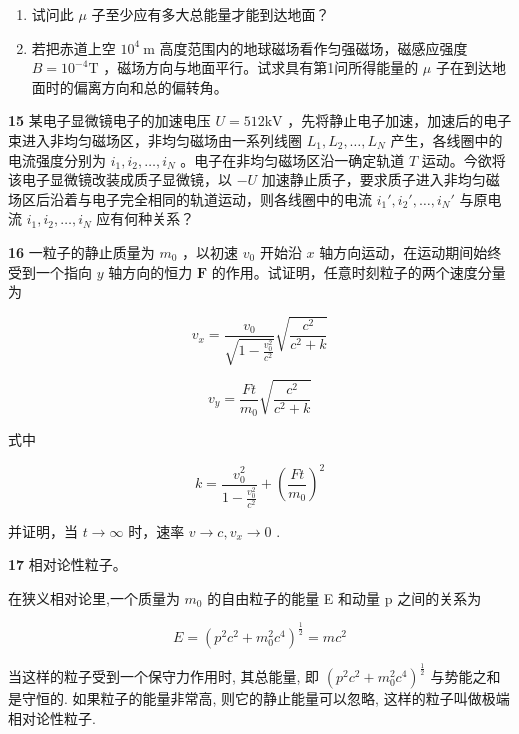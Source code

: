 \begin{enumerate}
\item 试问此 $\mu$ 子至少应有多大总能量才能到达地面？
\item 若把赤道上空 $10^{4} \mathrm{~m}$ 高度范围内的地球磁场看作匀强磁场，磁感应强度 $B = 10^{-4} \mathrm{T}$ ，磁场方向与地面平行。试求具有第1问所得能量的 $\mu$ 子在到达地面时的偏离方向和总的偏转角。
\end{enumerate}
\vfill

\newpage
\textbf{15}
某电子显微镜电子的加速电压 $U = 512\mathrm{kV}$ ，先将静止电子加速，加速后的电子束进入非均匀磁场区，非均匀磁场由一系列线圈 $L_{1}, L_{2}, \dots, L_{N}$ 产生，各线圈中的电流强度分别为 $i_{1}, i_{2}, \dots, i_{N}$ 。电子在非均匀磁场区沿一确定轨道 $T$ 运动。今欲将该电子显微镜改装成质子显微镜，以 $-U$ 加速静止质子，要求质子进入非均匀磁场区后沿着与电子完全相同的轨道运动，则各线圈中的电流 $i_{1}', i_{2}', \dots, i_{N}'$ 与原电流 $i_{1}, i_{2}, \dots, i_{N}$ 应有何种关系？
\vfill

\textbf{16}
一粒子的静止质量为 $m_0$ ，以初速 $v_0$ 开始沿 $x$ 轴方向运动，在运动期间始终受到一个指向 $y$ 轴方向的恒力 $\pmb{F}$ 的作用。试证明，任意时刻粒子的两个速度分量为

$$
v _ {x} = \frac {v _ {0}}{\sqrt {1 - \frac {v _ {0} ^ {2}}{c ^ {2}}}} \sqrt {\frac {c ^ {2}}{c ^ {2} + k}}
$$

$$
v _ {y} = \frac {F t}{m _ {0}} \sqrt {\frac {c ^ {2}}{c ^ {2} + k}}
$$

式中

$$
k = \frac {v _ {0} ^ {2}}{1 - \frac {v _ {0} ^ {2}}{c ^ {2}}} + \left(\frac {F t}{m _ {0}}\right) ^ {2}
$$

并证明，当 $t \to \infty$ 时，速率 $v \to c, v_x \to 0$ .
\vfill

\newpage
\textbf{17}
相对论性粒子。

在狭义相对论里,一个质量为 $m_{0}$ 的自由粒子的能量 E 和动量 p 之间的关系为

$$
E = (p ^ {2} c ^ {2} + m _ {0} ^ {2} c ^ {4}) ^ {\frac {1}{2}} = m c ^ {2}
$$

当这样的粒子受到一个保守力作用时, 其总能量, 即 $(p^2 c^2 + m_0^2 c^4)^{\frac{1}{2}}$ 与势能之和是守恒的. 如果粒子的能量非常高, 则它的静止能量可以忽略, 这样的粒子叫做极端相对论性粒子.

